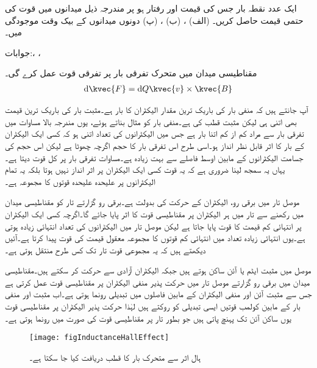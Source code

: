 ایک عدد نقطہ بار جس کی قیمت  اور رفتار  ہو پر مندرجہ ذیل میدانوں میں قوت کی حتمی قیمت حاصل کریں۔
(الف) ، (ب) ، (پ) دونوں میدانوں کے بیک وقت موجودگی میں۔

جوابات:،  ، 

مقناطیسی میدان میں متحرک تفرقی بار  پر تفرقی قوت  عمل کرے گی۔  
\begin{align}\label{مساوات_امالہ_مقناطیسی_تفرقی_قوت}
\dif \kvec{F}=\dif Q \kvec{v} \times \kvec{B}
\end{align}

آپ جانتے ہیں کہ منفی بار کی باریک ترین مقدار الیکٹران کا بار ہے۔مثبت بار کی باریک ترین قیمت بھی اتنی ہی لیکن مثبت قطب کی ہے۔منفی بار کو مثال بناتے ہوئے، یوں مندرجہ بالا مساوات میں تفرقی بار سے مراد کم از کم اتنا بار ہے جس میں الیکٹرانوں کی تعداد اتنی ہو کہ کسی ایک الیکٹران کے بار کا اثر قابل نظر انداز ہو۔اسی طرح اس تفرقی بار کا حجم اگرچہ چھوٹا ہے لیکن اس حجم کی جسامت الیکٹرانوں کے مابین اوسط فاصلے سے بہت زیادہ ہے۔مساوات  تفرقی بار پر کل قوت دیتا ہے۔یہاں یہ سمجھ لینا ضروری ہے کہ یہ قوت کسی ایک الیکٹران پر اثر انداز نہیں ہوتا بلکہ یہ تمام الیکٹرانوں پر علیحدہ علیحدہ قوتوں کا مجموعہ ہے۔ 

موصل تار میں برقی رو، الیکٹران کے حرکت کی بدولت ہے۔برقی رو گزارتے تار کو مقناطیسی میدان میں رکھنے سے تار میں ہر الیکٹران پر مقناطیسی قوت کا اثر پایا جائے گا۔اگرچہ کسی ایک الیکٹران پر انتہائی کم قیمت کا قوت پایا جاتا ہے لیکن موصل تار میں الیکٹرانوں کی تعداد انتہائی زیادہ ہوتی ہے۔یوں انتہائی زیادہ تعداد میں انتہائی کم قوتوں کا مجموعہ معقول قیمت کی قوت پیدا کرتا ہے۔آئیں دیکھتے ہیں کہ یہ مجموعی قوت تار تک کس طرح منتقل ہوتی ہے۔

موصل میں مثبت ایٹم یا آئن ساکن ہوتے ہیں جبکہ الیکٹران آزادی سے حرکت کر سکتے ہیں۔مقناطیسی میدان میں برقی رو گزارتے موصل تار میں حرکت پذیر منفی الیکٹران پر مقناطیسی قوت عمل کرتی ہے جس سے مثبت آئن اور منفی الیکٹران کے مابین فاصلوں میں تبدیلی رونما ہوتی ہے۔اب مثبت اور منفی بار کے مابین کولمب قوتیں ایسی تبدیلی کو روکتے ہیں لہٰذا حرکت پذیر الیکٹران پر مقناطیسی قوت یوں ساکن آئن تک پہنچ پاتی ہیں جو بطور تار پر مقناطیسی قوت کی صورت میں رونما ہوتی ہے۔

\begin{figure}
\centering
\texttt{[image: figInductanceHallEffect]}
\caption{ہال اثر سے متحرک بار کا قطب دریافت کیا جا سکتا ہے۔}
\label{شکل_امالہ_ہال_قطب_کا_حصول}
\end{figure}

